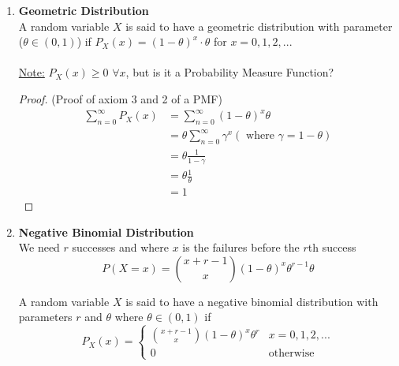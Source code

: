 \documentclass[12pt]{article}
\begin{document}
\begin{enumerate}
{\begin{proof}
	(Proof of (2.) in Note)\\
	\begin{align*}
		\sum_{x=0}^n P_X (x) &= \sum_{x=0}^n \binom{n}{x} \theta^x (1-\theta)^{n-x}\\
		&= (\theta + 1 - \theta)^n = 1^n = 1
	\end{align*}
	\underline{Recall that} $$(a+b)^n = \sum_{x=0}^n a^x b^{n-x}$$
\end{proof}
	
	}
	\item{
	\textbf{Geometric Distribution}\\
	A random variable $X$ is said to have a geometric distribution with parameter ($\theta \in (0,1)$) if $P_X (x) = (1 - \theta)^x \cdot \theta$ for $x = 0,1,2,...$\\
	\\
	\underline{Note:} $P_X (x) \geq 0$ $\forall x$, but is it a Probability Measure Function?\\
	\begin{proof}
	(Proof of axiom 3 and 2 of a PMF)\\
	\begin{align*}
		\sum_{n=0}^{\infty} P_X (x) &= \sum_{n=0}^{\infty} (1 - \theta)^x \theta\\
		&= \theta \sum_{n=0}^{\infty} \gamma^x (\text{ where } \gamma = 1 - \theta)\\
		&= \theta \frac{1}{1 - \gamma}\\
		&=\theta \frac{1}{\theta}\\
		&= 1
	\end{align*}
	\end{proof}
	}
	\item{
	\textbf{Negative Binomial Distribution}\\
	We need $r$ successes and where $x$ is the failures before the $r$th success
	$$P(X = x) = \binom{x+r - 1}{x} (1 - \theta)^x \theta^{r-1} \theta$$
	
	A random variable $X$ is said to have a negative binomial distribution with parameters $r$ and $\theta$ where $\theta \in (0,1)$ if\\
	$$P_X (x) = 
	\begin{cases}
		\binom{x+r - 1}{x} (1 - \theta)^x \theta^{r} & x = 0,1,2,...\\
		0 & \text{otherwise}
	\end{cases}$$
	}
\end{enumerate}

\newpage
\end{document}
